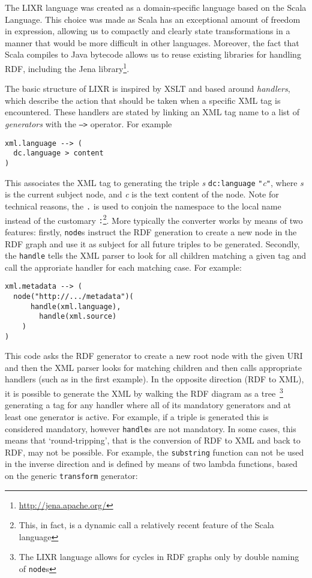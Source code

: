 \documentclass{acm_proc_article-sp}
\begin{document}
The LIXR language was created as a domain-specific language based on the Scala
Language. This choice was made as Scala has an exceptional amount of freedom in
expression, allowing us to compactly and clearly state transformations in a manner
that would be more difficult in other languages. Moreover, the fact that Scala
compiles to Java bytecode allows us to reuse existing libraries for handling
RDF, including the Jena library\footnote{\url{http://jena.apache.org/}}.

The basic structure of LIXR is inspired by XSLT and based around \emph{handlers},
which describe the action that should be taken when a specific XML tag is 
encountered. These handlers are stated by linking an XML tag name to a list
of \emph{generators} with the {\tt -->} operator. For example

\begin{verbatim}
xml.language --> (
  dc.language > content
)
\end{verbatim}

This associates the XML tag {\tt <xml:language>} to
generating the triple \emph{s} {\tt dc:language} {\tt "}\emph{c}{\tt "}, 
where \emph{s} is the current subject node, and \emph{c} is the text content of
the node. Note for technical reasons, the {\tt .} is used to conjoin the namespace
to the local name instead of the customary {\tt :}\footnote{This, in fact, is 
a dynamic call a relatively recent feature of the Scala language}. More typically
the converter works by means of two features: firstly, {\tt node}s instruct the RDF generation
to create a new node in the RDF graph and use it as subject for all future triples
to be generated. Secondly, the {\tt handle} tells the XML parser to look for all 
children matching a given tag and call the approriate handler for each matching
case. For example:

\begin{verbatim}
xml.metadata --> (
  node("http://.../metadata")(
	  handle(xml.language),
		handle(xml.source)
	)
)
\end{verbatim}

This code asks the RDF generator to create a new root node with the given URI and
then the XML parser looks for matching children and then calls appropriate handlers
(such as in the first example). In the opposite direction (RDF to XML), it is
possible to generate the XML by walking the RDF diagram as a tree~\footnote{
The LIXR language allows for cycles in RDF graphs only by double naming of
{\tt node}s} generating a
tag for any handler where all of its mandatory generators and at least one 
generator is active. For example, if a triple is generated this is considered
mandatory, however {\tt handle}s are not mandatory. In some cases, this means that
`round-tripping', that is the conversion of RDF to XML and back to RDF, may not
be possible. For example, the {\tt substring} function can not be used in the
inverse direction and is defined by means of two lambda functions, based on
the generic {\tt transform} generator:
\end{document}
